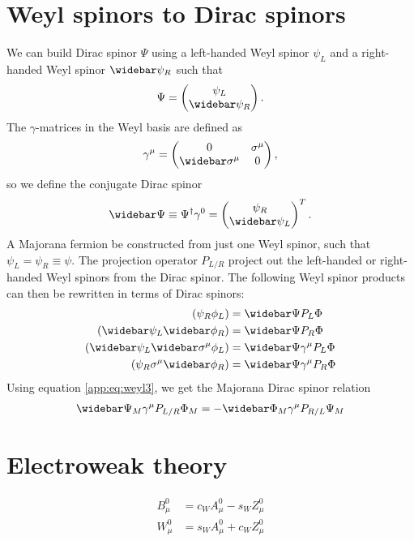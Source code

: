 \documentclass[english, notitlepage]{article}
\begin{document}
    \section{Weyl spinors to Dirac spinors}
        We can build Dirac spinor $\Psi$ using a left-handed Weyl spinor $\psi_L$ and a right-handed Weyl spinor $\wbar{\psi}_R$ such that
        \begin{align}
            \Psi = \begin{pmatrix} \psi_L \\ \wbar{\psi}_R \end{pmatrix}.
        \end{align}
        The $\gamma$-matrices in the Weyl basis are defined as
        \begin{align}
            \gamma^\mu = \begin{pmatrix} 0 & \sigma^\mu \\ \wbar{\sigma}^\mu & 0 \end{pmatrix},
        \end{align}
        so we define the conjugate Dirac spinor
        \begin{align}
            \wbar{\Psi} \equiv \Psi^\dag \gamma^0 = \begin{pmatrix} \psi_R \\ \wbar{\psi}_L \end{pmatrix}^T.
        \end{align}
        A Majorana fermion be constructed from just one Weyl spinor, such that $\psi_L = \psi_R \equiv \psi$.
        The projection operator $P_{L/R}$ project out the left-handed or right-handed Weyl spinors from the Dirac spinor. The following Weyl spinor products can then be rewritten in terms of Dirac spinors:
        \begin{subequations}
            \begin{align}
                (\psi_{R} \phi_{L}) &= \wbar{\Psi} P_L \Phi \\
                (\wbar{\psi}_L \wbar{\phi}_R) &= \wbar{\Psi} P_R \Phi \\
                (\wbar{\psi}_L \wbar{\sigma}^\mu \phi_L) &= \wbar{\Psi} \gamma^\mu P_L \Phi \\
                (\psi_R \sigma^\mu \wbar{\phi}_R) &= \wbar{\Psi} \gamma^\mu P_R \Phi
            \end{align}
        \end{subequations}
        Using equation \cref{app:eq:weyl3}, we get the Majorana Dirac spinor relation
        \begin{align}
            \wbar{\Psi}_M \gamma^\mu P_{L/R} \Phi_M = -\wbar{\Phi}_M \gamma^\mu P_{R/L} \Psi_M
        \end{align}

    
    \section{Electroweak theory}
        \begin{subequations}
            \begin{align}
                B^0_\mu &= c_W A^0_\mu - s_W Z^0_\mu \\
                W^0_\mu &= s_W A^0_\mu + c_W Z^0_\mu
            \end{align}
        \end{subequations}
\end{document}
